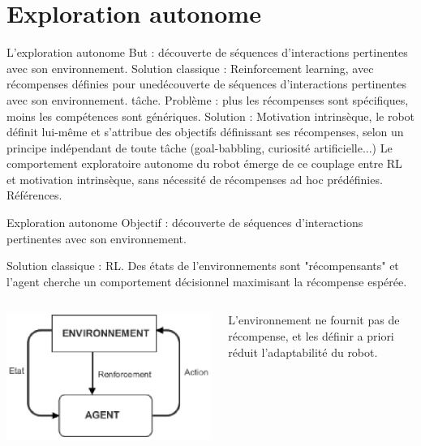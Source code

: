 \documentclass[xcolor=pst,dvips,12pt,english,french]{beamer}
\begin{document}
	\section{Exploration autonome}
	
	\begin{frame}{L'exploration autonome }
		But : découverte de séquences d'interactions pertinentes avec son environnement. 
		Solution classique : Reinforcement learning, avec récompenses définies pour unedécouverte de séquences d'interactions pertinentes avec son environnement.  tâche.
		Problème : plus les récompenses sont spécifiques, moins les compétences sont génériques.
		Solution : Motivation intrinsèque, le robot définit lui-même et s'attribue des objectifs définissant ses récompenses, selon un principe indépendant de toute tâche (goal-babbling, curiosité artificielle...)
		Le comportement exploratoire autonome du robot émerge de ce couplage entre RL et motivation intrinsèque, sans nécessité de récompenses ad hoc prédéfinies.
		Références.
	\end{frame}
	\begin{frame}{Exploration autonome}
		Objectif : découverte de séquences d'interactions pertinentes avec son environnement.
		
		Solution classique : RL. Des états de l'environnements sont "récompensants" et l'agent cherche un comportement décisionnel maximisant la récompense espérée.
		
		\begin{columns}
			\begin{column}{0.45\textwidth}
				\centering
				\includegraphics[width=\textwidth]{images/RL1.eps}
			\end{column}
			\begin{column}{0.5\textwidth}
				L'environnement ne fournit pas de récompense, et les définir a priori réduit l'adaptabilité du robot.
			\end{column}
		\end{columns}
	\end{frame}
	
\end{document}
